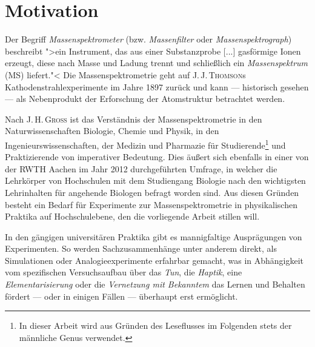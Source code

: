 \section{Motivation}
\label{kap:1}
Der Begriff \textit{Massenspektrometer} (bzw. \textit{Massenfilter} oder \textit{Massenspektrograph}) beschreibt ">ein Instrument, das aus einer Substanzprobe [...] gasförmige Ionen erzeugt, diese nach Masse und Ladung trennt und schließlich ein \textit{Massenspektrum} (MS) liefert."<\vspace*{-0.9cm}\vspace*{0.9cm} Die Massenspektrometrie geht auf \textsc{J.\,J.\,Thomson}s Kathodenstrahlexperimente im Jahre 1897 zurück und kann --- historisch gesehen --- als Nebenprodukt der Erforschung der Atomstruktur betrachtet werden.\par
Nach \textsc{J.\,H.\,Gross} ist das Verständnis der Massenspektrometrie in den Naturwissenschaften Biologie, Chemie und Physik, in den Ingenieurswissenschaften, der Medizin und Pharmazie für Studierende\vspace*{-0.9cm}\footnote{In dieser Arbeit wird aus Gründen des Leseflusses im Folgenden stets der männliche Genus verwendet.}\vspace*{0.9cm} und Praktizierende von imperativer Bedeutung. Dies äußert sich ebenfalls in einer von der RWTH Aachen im Jahr 2012 durchgeführten Umfrage, in welcher die Lehrkörper von Hochschulen mit dem Studiengang Biologie nach den wichtigsten Lehrinhalten für angehende Biologen befragt worden sind. Aus diesen Gründen besteht ein Bedarf für Experimente zur Massenspektrometrie in physikalischen Praktika auf Hochschulebene, den die vorliegende Arbeit stillen will.\par
In den gängigen universitären Praktika gibt es mannigfaltige Ausprägungen von Experimenten. So werden Sachzusammenhänge unter anderem direkt, als Simulationen oder Analogieexperimente erfahrbar gemacht, was in Abhängigkeit vom spezifischen Versuchsaufbau über das \textit{Tun}, die \textit{Haptik}, eine \textit{Elementarisierung} oder die \textit{Vernetzung mit Bekanntem} das Lernen und Behalten fördert --- oder in einigen Fällen --- überhaupt erst ermöglicht.\par
